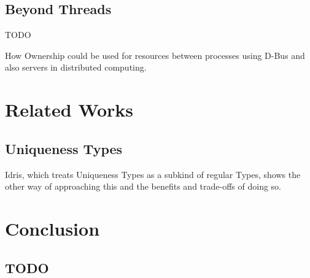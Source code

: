 \documentclass[onehalf,11pt]{beavtex}
\begin{document}
\section{Beyond Threads}

TODO

How Ownership could be used for resources between processes using D-Bus and also
servers in distributed computing.

\chapter{Related Works}

\section{Uniqueness Types}

Idris, which treats Uniqueness Types as a subkind of regular Types, shows
the other way of approaching this and the benefits and trade-offs of doing so.



\chapter{Conclusion}
\section{TODO}


{}

\end{document}
